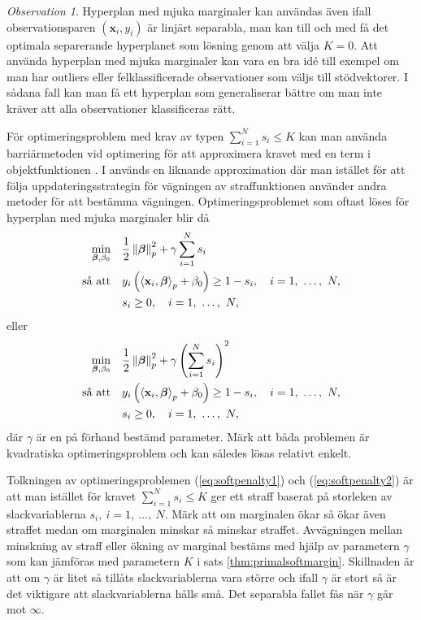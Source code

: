 \documentclass[a4paper, 12pt]{report}
\theoremstyle{definition}
\theoremstyle{remark}
\newtheorem*{rem}{Observation}
\newcommand{\bfbeta}{{\boldsymbol{\beta}}}
\newcommand{\bfx}{\mathbf{x}}
\newcommand{\llangle}{\left\langle}
\newcommand{\rrangle}{\right\rangle}
\newcommand{\inner}[2]{\llangle #1, #2 \rrangle}
\begin{document}
\begin{rem}
	Hyperplan med mjuka marginaler kan användas även ifall observationsparen $\left(\mathbf{x}_i, y_i\right)$ är linjärt separabla, man kan till och med få det optimala separerande hyperplanet som lösning genom att välja $K=0$. Att använda hyperplan med mjuka marginaler kan vara en bra idé till exempel om man har outliers eller felklassificerade observationer som väljs till stödvektorer. I sådana fall kan man få ett hyperplan som generaliserar bättre om man inte kräver att alla observationer klassificeras rätt.
\end{rem}

För optimeringsproblem med krav av typen $\sum_{i=1}^{N}s_i\leq K$ kan man använda barriärmetoden vid optimering för att approximera kravet med en term i objektfunktionen \cite{Boyd}. I \cite{CortesVapnik} används en liknande approximation där man istället för att följa uppdateringsstrategin för vägningen av straffunktionen använder andra metoder för att bestämma vägningen. Optimeringsproblemet som oftast löses för hyperplan med mjuka marginaler blir då
\begin{equation}\label{eq:softpenalty1}
\begin{aligned}
	\operatornamewithlimits{min}_{\bfbeta, \beta_0} & & &\frac{1}{2}\left\|\bfbeta
\right\|_p^2 + \gamma\sum_{i=1}^{N} s_i\\
	\text{så att} & & &y_i\left(\inner{\bfx_i}{\bfbeta}_p+\beta_0\right)\geq 1 - s_i,\quad i=1,~\dots,~N,\\
	& & &s_i\geq0,\quad i=1,~\dots,~N,
\end{aligned}
\end{equation}
eller
\begin{equation}\label{eq:softpenalty2}
\begin{aligned}
\operatornamewithlimits{min}_{\bfbeta, \beta_0} & & &\frac{1}{2}\left\|\bfbeta
\right\|_p^2 + \gamma\left(\sum_{i=1}^{N} s_i\right)^2\\
\text{så att} & & &y_i\left(\inner{\bfx_i}{\bfbeta}_p+\beta_0\right)\geq 1 - s_i,\quad i=1,~\dots,~N,\\
& & &s_i\geq0,\quad i=1,~\dots,~N,
\end{aligned}
\end{equation}
där $\gamma$ är en på förhand bestämd parameter.
Märk att båda problemen är kvadratiska optimeringsproblem och kan således lösas relativt enkelt.

Tolkningen av optimeringsproblemen (\ref{eq:softpenalty1}) och (\ref{eq:softpenalty2}) är att man istället för kravet $\sum_{i=1}^{N}s_i\leq K$ ger ett straff baserat på storleken av slackvariablerna $s_i,~i=1,~\dots,~N$. Märk att om marginalen ökar så ökar även straffet medan om marginalen minskar så minskar straffet. Avvägningen mellan minskning av straff eller ökning av marginal bestäms med hjälp av parametern $\gamma$ som kan jämföras med parametern $K$ i sats \ref{thm:primalsoftmargin}. Skillnaden är att om $\gamma$ är litet så tillåts slackvariablerna vara större och ifall $\gamma$ är stort så är det viktigare att slackvariablerna hålls små. Det separabla fallet fås när $\gamma$ går mot $\infty$.
\end{document}
